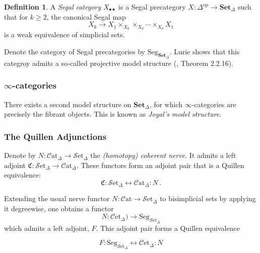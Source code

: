 \documentclass[a4paper,11pt]{article}
\newcommand{\ccal}{\mathcal{C}}
\newcommand{\sets}{\mathbf{Set}}
\newcommand{\scal}{\mathcal{S}}
\theoremstyle{plain}
\theoremstyle{definition}
\newtheorem{defi}[thm]{Definition}
\theoremstyle{remark}
\begin{document}
\begin{defi}
A \textit{Segal category} $X_{\bullet \bullet}$ is a Segal precategory $X \colon \Delta^{\text{op}} \to \sets_{\Delta}$ such that for $k \geq 2$, the canonical Segal map 
$$X_k \to X_1 \times_{X_0} \times_{X_0} \cdots \times_{X_0} X_1$$
is a weak equivalence of simplicial sets. 
\end{defi}

Denote the category of Segal precategories by $\text{Seg}_{\sets_{\Delta}}$. Lurie shows that this categroy admits a so-called projective model structure (\cite{lurie2}, Theorem 2.2.16). 


\subsubsection{$\infty$-categories}

There exists a second model structure on $\sets_{\Delta}$, for which $\infty$-categories are precisely the fibrant objects. This is known as \textit{Joyal's model structure}. 


\subsubsection{The Quillen Adjunctions}



Denote by $N \colon \ccal \text{at}_{\Delta} \to \scal\text{et}_{\Delta}$ the \textit{(homotopy) coherent nerve}. It admits a left adjoint $\mathfrak{C} \colon \scal \text{et}_{\Delta} \to \ccal \text{at}_{\Delta}$. These functors form an adjoint pair that is a Quillen equivalence:
\begin{equation}
\label{coherent_nerve}
\mathfrak{C} \colon \scal \text{et}_{\Delta} \longleftrightarrow \ccal\text{at}_{\Delta} \colon N \, .
\end{equation}

Extending the usual nerve functor $N \colon \ccal\text{at} \to \scal \text{et}_{\Delta}$ to bisimplicial sets by applying it degreewise, one obtains a functor 
$$N \colon \ccal \text{et}_{\Delta}) \to \text{Seg}_{\scal \text{et}_{\Delta}}$$
which admits a left adjoint, $F$. This adjoint pair forms a Quillen equivalence 

\begin{equation}
\label{bisimplicial_nerve}
F \colon \text{Seg}_{\scal \text{et}_{\Delta}} \longleftrightarrow \ccal \text{et}_{\Delta} \colon N 
\end{equation}
\end{document}

